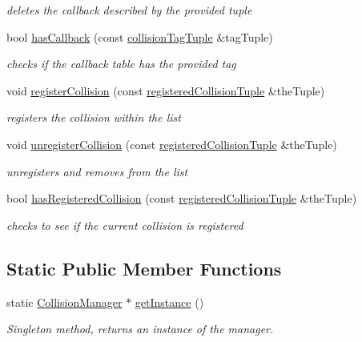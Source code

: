 \begin{DoxyCompactItemize}
\begin{DoxyCompactList}\small\item\em deletes the callback described by the provided tuple \end{DoxyCompactList}\item 
bool \hyperlink{class_collision_manager_a98395760494f7976f75c1d50072dcc5a}{has\-Callback} (const \hyperlink{_collision_manager_8h_a59fec3c97983b1c074529cfdd245515a}{collision\-Tag\-Tuple} \&tag\-Tuple)
\begin{DoxyCompactList}\small\item\em checks if the callback table has the provided tag \end{DoxyCompactList}\item 
void \hyperlink{class_collision_manager_abe04add405129184fdb5b76c079fd34a}{register\-Collision} (const \hyperlink{_collision_manager_8h_ada58768e1593bf8b68e443116782f54e}{registered\-Collision\-Tuple} \&the\-Tuple)
\begin{DoxyCompactList}\small\item\em registers the collision within the list \end{DoxyCompactList}\item 
void \hyperlink{class_collision_manager_ad92675882f024a11730b1276b0949f04}{unregister\-Collision} (const \hyperlink{_collision_manager_8h_ada58768e1593bf8b68e443116782f54e}{registered\-Collision\-Tuple} \&the\-Tuple)
\begin{DoxyCompactList}\small\item\em unregisters and removes from the list \end{DoxyCompactList}\item 
bool \hyperlink{class_collision_manager_a3dd0b50dcdee6bfd6ddcdaf7eec0c66b}{has\-Registered\-Collision} (const \hyperlink{_collision_manager_8h_ada58768e1593bf8b68e443116782f54e}{registered\-Collision\-Tuple} \&the\-Tuple)
\begin{DoxyCompactList}\small\item\em checks to see if the current collision is registered \end{DoxyCompactList}\end{DoxyCompactItemize}
\subsection*{Static Public Member Functions}
\begin{DoxyCompactItemize}
\item 
static \hyperlink{class_collision_manager}{Collision\-Manager} $\ast$ \hyperlink{class_collision_manager_ac51da5d2ebdf95cef311c9c23280f806}{get\-Instance} ()
\begin{DoxyCompactList}\small\item\em Singleton method, returns an instance of the manager. \end{DoxyCompactList}\end{DoxyCompactItemize}


